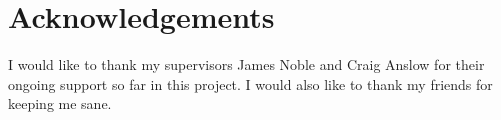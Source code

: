 \chapter*{Acknowledgements}\label{C:Acknowledge}

I would like to thank my supervisors James Noble and Craig Anslow for their ongoing support so far in this project. 
\newline
\newline
I would also like to thank my friends for keeping me sane.